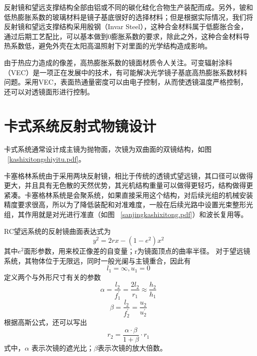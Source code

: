 反射镜和望远支撑结构全部由铝或不同的碳化硅化合物生产装配而成。另外，铍和低热膨胀系数的玻璃材料是镜子基底很好的选择材料；但是根据实际情况，我们将反射镜和望远支撑结构采用殷钢（Invar Steel），这种合金材料属于低膨胀合金，通过后期工艺配比，可以基本做到0膨胀系数的要求，除此之外，这种合金材料导热系数低，避免外壳在太阳高温照射下对里面的光学结构造成影响。

由于热应力造成的像差，高热膨胀系数的镜面材质令人关注。可变辐射涂料（VEC）是一项正在发展中的技术，有可能解决光学镜子基底高热膨胀系数材料问题。采用VEC，表面热通量密度可以由电子控制，从而使透镜温度严格控制，还可以对透镜面形进行控制。


\section{卡式系统反射式物镜设计}

卡式系统通常设计成主镜为抛物面，次镜为双曲面的双镜结构，如图 ~\ref{kashixitongshiyitu.pdf}。


卡塞格林系统由于采用两块反射镜，相比于传统的透镜式望远镜，其口径可以做得更大，并且具有无色散的天然优势，其光机结构重量可以做得更轻巧，结构做得更紧凑。卡塞格林系统是会聚系统，如果直接采用这个结构，对后续光组的机械安装精度要求很高，所以为了降低装配和对准难度，一般在后续光路中设置光束整形光组，其作用就是对光进行准直（如图 ~\ref{sanjingkashixitong.pdf}）和波长复用等。

RC望远系统的反射镜曲面表达式为
\begin{equation}\label{反射镜曲面表达式}
 y^2 = 2rx-(1-e^2 )x^2 
\end{equation}
其中$ e^2  $面形参数，用来校正像差的自变量；r为镜面顶点的曲率半径。
对于望远镜系统，其物体位于无限远，同时一般光阑与主镜重合，因此有
$$ l_1=\infty,u_1=0 $$
定义两个与外形尺寸有关的参数
\begin{equation}\label{n1}
 \alpha = \dfrac{l_2}{f_{1}^{'}} = \dfrac{2l_2}{r_1} \approx \dfrac{h_2}{h_1}
\end{equation}
\begin{equation}\label{n2}
 \beta = \dfrac{l_2 ^{}}{f_{2}^{'}} =  \dfrac{u_2}{u_2^{'}}
\end{equation}
根据高斯公式，还可以写出
\begin{equation}\label{n3}
 r_{2} =  \dfrac{\alpha \cdot\beta}{1+\beta}\cdot r_1
\end{equation}
式中，$ \alpha $ 表示次镜的遮光比；$ \beta $表示次镜的放大倍数。

